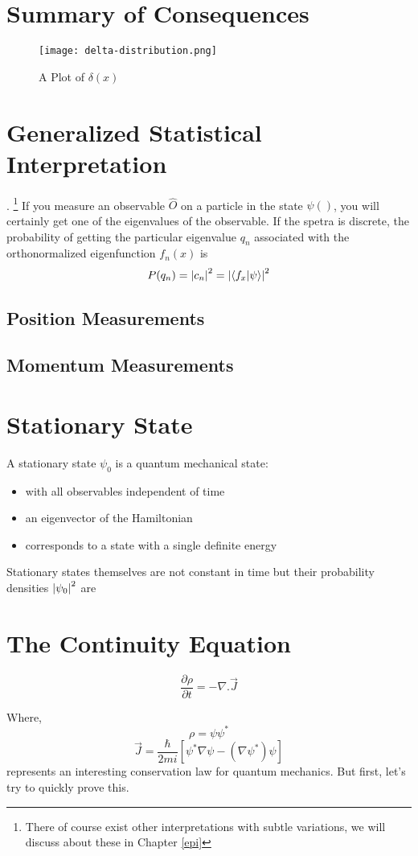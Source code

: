 \section{Summary of Consequences}
\begin{figure}
	\centering
	\texttt{[image: delta-distribution.png]}
	\caption{A Plot of $\delta(x)$}
\end{figure}
\section{Generalized Statistical Interpretation}
. \footnote{There of course exist other interpretations with subtle variations, we will discuss about these in Chapter \ref{epi}} If you measure an observable $\hat{O}$ on a particle in the state $\psi()$, you will certainly get one of the eigenvalues of the observable. If the spetra is discrete, the probability of getting the particular eigenvalue $q_{n}$ associated with the orthonormalized eigenfunction $f_{n}(x)$ is
\begin{equation}
	P(q_{n}) = \abs{c_{n}}^{2} = \abs{\braket{f_{x}}{\psi}}^{2}
\end{equation}
\subsection{Position Measurements}

\subsection{Momentum Measurements}

\section{Stationary State}
A  stationary state $\psi_{0}$ is a quantum mechanical state:
\begin{itemize}
\item with all observables independent of time
\item an eigenvector of the Hamiltonian
\item corresponds to a state with a single definite energy
\end{itemize}
Stationary states themselves are not constant in time but their probability densities $\abs{\psi_{0}}^{2}$ are
\section{The Continuity Equation}
\begin{tcolorbox}
\begin{equation}
\frac{\partial \rho}{\partial t} = - \nabla . \vec{J}
\end{equation}
\end{tcolorbox}
Where,
$$\rho = \psi \psi^{*}$$
$$\vec{J} = \frac{\hbar}{2mi} \left[ \psi^{*} \nabla \psi - (\nabla \psi^{*})\psi\right]$$
represents an interesting conservation law for quantum mechanics. But first, let's try to quickly prove this. 
